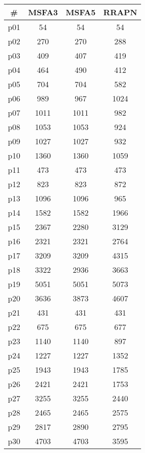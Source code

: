 \begin{tabular}{cccc}
\toprule
\textbf{\#} & \textbf{MSFA3} & \textbf{MSFA5} & \textbf{RRAPN}\\
\midrule
p01 & 54 & 54 & 54\\
p02 & 270 & 270 & 288\\
p03 & 409 & 407 & 419\\
p04 & 464 & 490 & 412\\
p05 & 704 & 704 & 582\\
p06 & 989 & 967 & 1024\\
p07 & 1011 & 1011 & 982\\
p08 & 1053 & 1053 & 924\\
p09 & 1027 & 1027 & 932\\
p10 & 1360 & 1360 & 1059\\
p11 & 473 & 473 & 473\\
p12 & 823 & 823 & 872\\
p13 & 1096 & 1096 & 965\\
p14 & 1582 & 1582 & 1966\\
p15 & 2367 & 2280 & 3129\\
p16 & 2321 & 2321 & 2764\\
p17 & 3209 & 3209 & 4315\\
p18 & 3322 & 2936 & 3663\\
p19 & 5051 & 5051 & 5073\\
p20 & 3636 & 3873 & 4607\\
p21 & 431 & 431 & 431\\
p22 & 675 & 675 & 677\\
p23 & 1140 & 1140 & 897\\
p24 & 1227 & 1227 & 1352\\
p25 & 1943 & 1943 & 1785\\
p26 & 2421 & 2421 & 1753\\
p27 & 3255 & 3255 & 2440\\
p28 & 2465 & 2465 & 2575\\
p29 & 2817 & 2890 & 2795\\
p30 & 4703 & 4703 & 3595\\
\bottomrule
\end{tabular}

